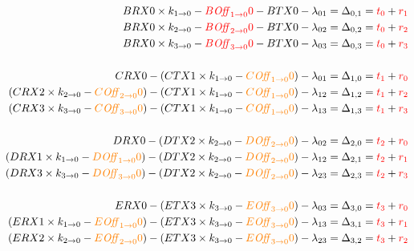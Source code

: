 \documentclass{article}
\begin{document}
\begin{align}
BRX0 \times k_{1\rightarrow0} - \unk{B\off{1}{0}0} - BTX0 - \lambda_{01} &= \Delta_{0,1} = \unk{t_0} + \unk{r_1} \\
BRX0 \times k_{2\rightarrow0} - \unk{B\off{2}{0}0} - BTX0 - \lambda_{02} &= \Delta_{0,2} = \unk{t_0} + \unk{r_2} \\
BRX0 \times k_{3\rightarrow0} - \unk{B\off{3}{0}0} - BTX0 - \lambda_{03} &= \Delta_{0,3} = \unk{t_0} + \unk{r_3} \\
~\nonumber\\
CRX0                                                 - (CTX1 \times k_{1\rightarrow0} - \der{C\off{1}{0}0}) - \lambda_{01} &= \Delta_{1,0} = \unk{t_1} + \unk{r_0} \\
(CRX2 \times k_{2\rightarrow0} - \der{C\off{2}{0}0}) - (CTX1 \times k_{1\rightarrow0} - \der{C\off{1}{0}0}) - \lambda_{12} &= \Delta_{1,2} = \unk{t_1} + \unk{r_2} \\
(CRX3 \times k_{3\rightarrow0} - \der{C\off{3}{0}0}) - (CTX1 \times k_{1\rightarrow0} - \der{C\off{1}{0}0}) - \lambda_{13} &= \Delta_{1,3} = \unk{t_1} + \unk{r_3} \\
~\nonumber\\
DRX0                                                 - (DTX2 \times k_{2\rightarrow0} - \der{D\off{2}{0}0}) - \lambda_{02} &= \Delta_{2,0} = \unk{t_2} + \unk{r_0} \\
(DRX1 \times k_{1\rightarrow0} - \der{D\off{1}{0}0}) - (DTX2 \times k_{2\rightarrow0} - \der{D\off{2}{0}0}) - \lambda_{12} &= \Delta_{2,1} = \unk{t_2} + \unk{r_1} \\
(DRX3 \times k_{3\rightarrow0} - \der{D\off{3}{0}0}) - (DTX2 \times k_{2\rightarrow0} - \der{D\off{2}{0}0}) - \lambda_{23} &= \Delta_{2,3} = \unk{t_2} + \unk{r_3} \\
~\nonumber\\
ERX0                                                 - (ETX3 \times k_{3\rightarrow0} - \der{E\off{3}{0}0}) - \lambda_{03} &= \Delta_{3,0} = \unk{t_3} + \unk{r_0} \\
(ERX1 \times k_{1\rightarrow0} - \der{E\off{1}{0}0}) - (ETX3 \times k_{3\rightarrow0} - \der{E\off{3}{0}0}) - \lambda_{13} &= \Delta_{3,1} = \unk{t_3} + \unk{r_1} \\
(ERX2 \times k_{2\rightarrow0} - \der{E\off{2}{0}0}) - (ETX3 \times k_{3\rightarrow0} - \der{E\off{3}{0}0}) - \lambda_{23} &= \Delta_{3,2} = \unk{t_3} + \unk{r_2}
\end{align}
\end{document}
